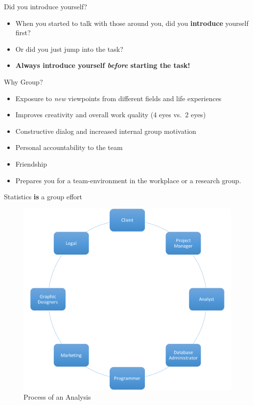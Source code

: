 \begin{frame}{Did you introduce yourself?}

\begin{itemize}
\tightlist
\item
  When you started to talk with those around you, did you
  \textbf{introduce} yourself first?
\item
  Or did you just jump into the task?
\item
  \textbf{Always introduce yourself \emph{before} starting the task!}
\end{itemize}

\end{frame}

\begin{frame}{Why Group?}

\begin{itemize}
\tightlist
\item
  Exposure to \emph{new} viewpoints from different fields and life
  experiences
\item
  Improves creativity and overall work quality (4 eyes vs.~2 eyes)
\item
  Constructive dialog and increased internal group motivation
\item
  Personal accountability to the team
\item
  Friendship
\item
  Prepares you for a team-environment in the workplace or a research
  group.
\end{itemize}

\end{frame}

\begin{frame}{Statistics \textbf{is} a group effort}

\begin{figure}[htbp]
\centering
\includegraphics{figures/circle_of_statistics.png}
\caption{Process of an Analysis}
\end{figure}

\end{frame}

